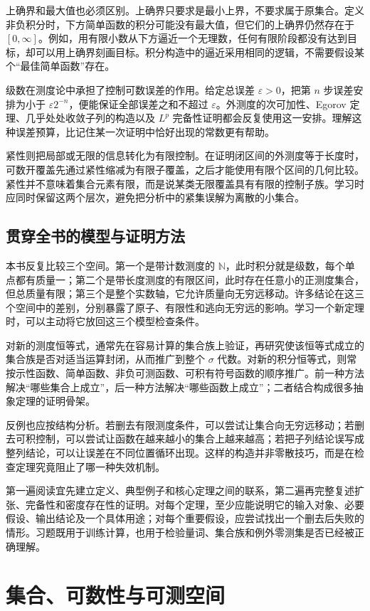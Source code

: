 \documentclass[UTF8,12pt,a4paper,fontset=fandol]{ctexbook}
\begin{document}
上确界和最大值也必须区别。上确界只要求是最小上界，不要求属于原集合。定义非负积分时，下方简单函数的积分可能没有最大值，但它们的上确界仍然存在于 $[0,\infty]$。例如，用有限小数从下方逼近一个无理数，任何有限阶段都没有达到目标，却可以用上确界刻画目标。积分构造中的逼近采用相同的逻辑，不需要假设某个“最佳简单函数”存在。

级数在测度论中承担了控制可数误差的作用。给定总误差 $\varepsilon>0$，把第 $n$ 步误差安排为小于 $\varepsilon2^{-n}$，便能保证全部误差之和不超过 $\varepsilon$。外测度的次可加性、Egorov 定理、几乎处处收敛子列的构造以及 $L^p$ 完备性证明都会反复使用这一安排。理解这种误差预算，比记住某一次证明中恰好出现的常数更有帮助。

紧性则把局部或无限的信息转化为有限控制。在证明闭区间的外测度等于长度时，可数开覆盖先通过紧性缩减为有限子覆盖，之后才能使用有限个区间的几何比较。紧性并不意味着集合元素有限，而是说某类无限覆盖具有有限的控制子族。学习时应同时保留这两个层次，避免把分析中的紧集误解为离散的小集合。

\section{贯穿全书的模型与证明方法}
本书反复比较三个空间。第一个是带计数测度的 $\mathbb N$，此时积分就是级数，每个单点都有质量一；第二个是带长度测度的有限区间，此时存在任意小的正测度集合，但总质量有限；第三个是整个实数轴，它允许质量向无穷远移动。许多结论在这三个空间中的差别，分别暴露了原子、有限性和逃向无穷远的影响。学习一个新定理时，可以主动将它放回这三个模型检查条件。

对新的测度恒等式，通常先在容易计算的集合族上验证，再研究使该恒等式成立的集合族是否对适当运算封闭，从而推广到整个 $\sigma$ 代数。对新的积分恒等式，则常按示性函数、简单函数、非负可测函数、可积有符号函数的顺序推广。前一种方法解决“哪些集合上成立”，后一种方法解决“哪些函数上成立”；二者结合构成很多抽象定理的证明骨架。

反例也应按结构分析。若删去有限测度条件，可以尝试让集合向无穷远移动；若删去可积控制，可以尝试让函数在越来越小的集合上越来越高；若把子列结论误写成整列结论，可以让误差在不同位置循环出现。这样的构造并非零散技巧，而是在检查定理究竟阻止了哪一种失效机制。

第一遍阅读宜先建立定义、典型例子和核心定理之间的联系，第二遍再完整复述扩张、完备性和密度存在性的证明。对每个定理，至少应能说明它的输入对象、必要假设、输出结论及一个具体用途；对每个重要假设，应尝试找出一个删去后失败的情形。习题既用于训练计算，也用于检验量词、集合族和例外零测集是否已经被正确理解。

\chapter{集合、可数性与可测空间}
\label{chap:mt-sets}
\end{document}
